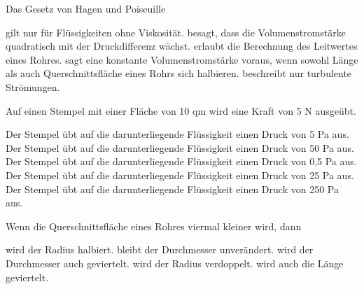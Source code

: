 \documentclass[11pt]{exam}
\begin{document}
\setlength{\voffset}{-0.5in}
\setlength{\headsep}{5pt}

\hspace{2mm}
 \hspace{5mm}
\vspace{4mm}

\begin{questions}

\question Das Gesetz von Hagen und Poiseuille

\begin{choices}
	\choice gilt nur für Flüssigkeiten ohne Viskosität.
	\choice besagt, dass die Volumenstromstärke quadratisch mit der Druckdifferenz wächst.
	\choice erlaubt die Berechnung des Leitwertes eines Rohres.
	\choice sagt eine konstante Volumenstromstärke voraus, wenn sowohl Länge als auch Querschnittsfläche eines Rohrs sich halbieren.
	\choice beschreibt nur turbulente Strömungen.
\end{choices}

\vspace{3mm}\question Auf einen Stempel mit einer Fläche von 10 qm wird eine Kraft von 5 N ausgeübt.

\begin{choices}
	\choice Der Stempel übt auf die darunterliegende Flüssigkeit einen Druck von 5 Pa aus.
	\choice Der Stempel übt auf die darunterliegende Flüssigkeit einen Druck von 50 Pa aus.
	\choice Der Stempel übt auf die darunterliegende Flüssigkeit einen Druck von 0,5 Pa aus.
	\choice Der Stempel übt auf die darunterliegende Flüssigkeit einen Druck von 25 Pa aus.
	\choice Der Stempel übt auf die darunterliegende Flüssigkeit einen Druck von 250 Pa aus.
\end{choices}

\vspace{3mm}\question Wenn die Querschnittsfläche eines Rohres viermal kleiner wird, dann

\begin{choices}
	\choice wird der Radius halbiert.
	\choice bleibt der Durchmesser unverändert.
	\choice wird der Durchmesser auch geviertelt.
	\choice wird der Radius verdoppelt.
	\choice wird auch die Länge geviertelt.
\end{choices}


\end{questions}
\end{document}
